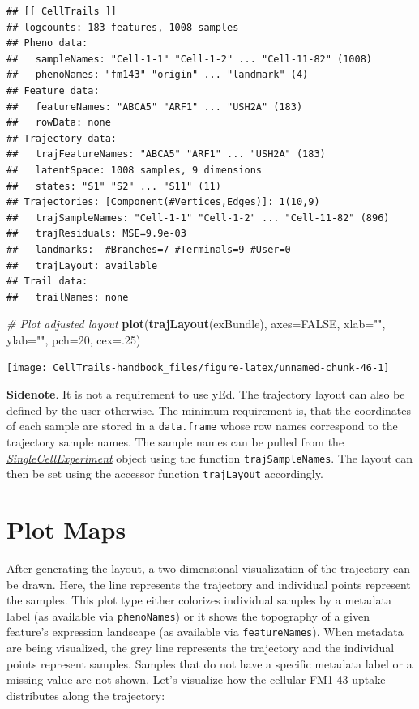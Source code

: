 \documentclass[]{book}
\newenvironment{Shaded}{\begin{snugshade}}{\end{snugshade}}
\newcommand{\KeywordTok}[1]{\textcolor[rgb]{0.13,0.29,0.53}{\textbf{#1}}}
\newcommand{\DataTypeTok}[1]{\textcolor[rgb]{0.13,0.29,0.53}{#1}}
\newcommand{\DecValTok}[1]{\textcolor[rgb]{0.00,0.00,0.81}{#1}}
\newcommand{\StringTok}[1]{\textcolor[rgb]{0.31,0.60,0.02}{#1}}
\newcommand{\CommentTok}[1]{\textcolor[rgb]{0.56,0.35,0.01}{\textit{#1}}}
\newcommand{\OtherTok}[1]{\textcolor[rgb]{0.56,0.35,0.01}{#1}}
\newcommand{\NormalTok}[1]{#1}
\theoremstyle{definition}
\theoremstyle{definition}
\theoremstyle{definition}
\theoremstyle{remark}
\begin{document}
\begin{verbatim}
## [[ CellTrails ]] 
## logcounts: 183 features, 1008 samples
## Pheno data: 
##   sampleNames: "Cell-1-1" "Cell-1-2" ... "Cell-11-82" (1008)
##   phenoNames: "fm143" "origin" ... "landmark" (4)
## Feature data: 
##   featureNames: "ABCA5" "ARF1" ... "USH2A" (183)
##   rowData: none
## Trajectory data: 
##   trajFeatureNames: "ABCA5" "ARF1" ... "USH2A" (183)
##   latentSpace: 1008 samples, 9 dimensions
##   states: "S1" "S2" ... "S11" (11)
## Trajectories: [Component(#Vertices,Edges)]: 1(10,9)
##   trajSampleNames: "Cell-1-1" "Cell-1-2" ... "Cell-11-82" (896)
##   trajResiduals: MSE=9.9e-03
##   landmarks:  #Branches=7 #Terminals=9 #User=0
##   trajLayout: available
## Trail data: 
##   trailNames: none
\end{verbatim}

\begin{Shaded}
\begin{Highlighting}[]
\CommentTok{# Plot adjusted layout}
\KeywordTok{plot}\NormalTok{(}\KeywordTok{trajLayout}\NormalTok{(exBundle), }\DataTypeTok{axes=}\OtherTok{FALSE}\NormalTok{, }\DataTypeTok{xlab=}\StringTok{""}\NormalTok{, }\DataTypeTok{ylab=}\StringTok{""}\NormalTok{, }\DataTypeTok{pch=}\DecValTok{20}\NormalTok{, }\DataTypeTok{cex=}\NormalTok{.}\DecValTok{25}\NormalTok{)}
\end{Highlighting}
\end{Shaded}

\texttt{[image: CellTrails-handbook\_files/figure-latex/unnamed-chunk-46-1]}

\textbf{Sidenote}. It is not a requirement to use yEd. The trajectory
layout can also be defined by the user otherwise. The minimum
requirement is, that the coordinates of each sample are stored in a
\texttt{data.frame} whose row names correspond to the trajectory sample
names. The sample names can be pulled from the
\emph{\href{http://bioconductor.org/packages/SingleCellExperiment}{SingleCellExperiment}}
object using the function \texttt{trajSampleNames}. The layout can then
be set using the accessor function \texttt{trajLayout} accordingly.

\section{Plot Maps}\label{plot-maps}

After generating the layout, a two-dimensional visualization of the
trajectory can be drawn. Here, the line represents the trajectory and
individual points represent the samples. This plot type either colorizes
individual samples by a metadata label (as available via
\texttt{phenoNames}) or it shows the topography of a given feature's
expression landscape (as available via \texttt{featureNames}). When
metadata are being visualized, the grey line represents the trajectory
and the individual points represent samples. Samples that do not have a
specific metadata label or a missing value are not shown. Let's
visualize how the cellular FM1-43 uptake distributes along the
trajectory:
\end{document}
